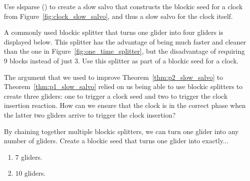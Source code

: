 \begin{multicols}{2}
	
	\mfilbreak
	
	
	\begin{problem}\label{exer:create_clock_turners_nonsync} 
		Use slsparse () to create a slow salvo that constructs the blockic seed for a clock from Figure~\ref{fig:clock_slow_salvo}, and thus a slow salvo for the clock itself.
	\end{problem}
	
	
	\mfilbreak
	
	
	\begin{problem}\label{exer:new_splitter} 
		A commonly used blockic splitter that turns one glider into four gliders is displayed below. This splitter has the advantage of being much faster and cleaner than the one in Figure~\ref{fig:one_time_splitter}, but the disadvantage of requiring 9 blocks instead of just 3. Use this splitter as part of a blockic seed for a clock.
		\begin{center}
		\end{center}
	\end{problem}
	
	
	\mfilbreak
	
	
	\begin{problemstar}\label{exer:p2_salvo_reduce_to_p1} 
		The argument that we used to improve Theorem~\ref{thm:p2_slow_salvo} to Theorem~\ref{thm:p1_slow_salvo} relied on us being able to use blockic splitters to create three gliders: one to trigger a clock seed and two to trigger the clock insertion reaction. How can we ensure that the clock is in the correct phase when the latter two gliders arrive to trigger the clock insertion?
	\end{problemstar}


	\mfilbreak
	
	
	\begin{problem}\label{exer:blockic_splitter_chain} 
		By chaining together multiple blockic splitters, we can turn one glider into any number of gliders. Create a blockic seed that turns one glider into exactly...
		\begin{enumerate}[label=\bf\color{ocre}(\alph*)]
			\item $7$ gliders.
			
			\item $10$ gliders.
			

\end{enumerate}
\end{problem}
\end{multicols}
